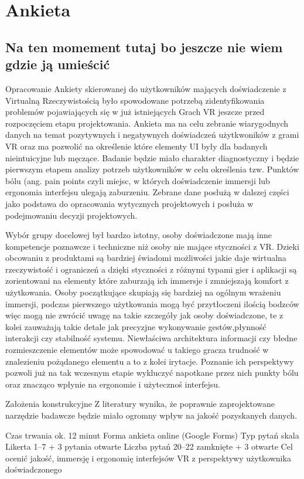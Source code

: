 \chapter{Ankieta}
\section{Na ten momement tutaj bo jeszcze nie wiem gdzie ją umieścić}
Opracowanie Ankiety skierowanej do użytkowników mających doświadczenie z Virtualną Rzeczywistością było spowodowane potrzebą zidentyfikowania problemów pojawiających się w już istniejących Grach VR jeszcze przed rozpoczęciem etapu projektowania. Ankieta ma na celu zebranie wiarygodnych danych na temat pozytywnych i negatywnych doświadczeń użytkwoników z grami VR oraz ma pozwolić na określenie które elementy UI były dla badanych nieintuicyjne lub męczące. Badanie będzie miało charakter diagnostyczny i będzie pierwszym etapem analizy potrzeb użytkowników w celu określenia tzw. Punktów bólu (ang. pain points czyli miejsc, w których doświadczenie immersji lub ergonomia interfejsu ulegają zaburzeniu. Zebrane dane posłużą w dalszej części jako podstawa do opracowania wytycznych projektowych i posłuża w podejmowaniu decyzji projektowych.

Wybór grupy docelowej był bardzo istotny, osoby doświadczone mają inne kompetencje poznawcze i techniczne niż osoby nie mające styczności z VR. Dzieki obcowaniu z produktami są bardziej świadomi możliwości jakie daje wirtualna rzeczywistość i ograniczeń a dzięki styczności z różnymi typami gier i aplikacji są zorientowani na elementy które zaburzają ich immersje i zmniejszają komfort z użytkowania. Osoby początkujące skupiają się bardziej na ogólnym wrażeniu immersji, podczas pierwszego użytkowania mogą być przytłoczeni ilością bodzców więc mogą nie zwrócić uwagę na takie szczegóły jak osoby doświadczone, te z kolei zauważają takie detale jak precyzjne wykonywanie gestów,płynność interakcji czy stabilność systemu. Niewłaściwa architektura informacji  czy błedne rozmieszczenie elementów może spowodować u takiego gracza trudność w znalezieniu pożądanego elementu a to z kolei irytacje. Poznanie ich perspektywy pozwoli już na tak wczesnym etapie wykluczyć napotkane przez nich punkty bólu oraz znacząco wpłynie na ergonomie i użytecznoś interfejsu. 

Założenia konstrukcyjne
Z literatury wynika, że poprawnie zaprojektowane narzędzie badawcze będzie miało ogromny wpływ na jakość pozyskanych danych.

Czas trwania	ok. 12 minut
Forma	ankieta online (Google Forms)
Typ pytań	skala Likerta 1–7 + 3 pytania otwarte
Liczba pytań	20–22 zamknięte + 3 otwarte
Cel	ocenić jakość, immersję i ergonomię interfejsów VR z perspektywy użytkownika doświadczonego

